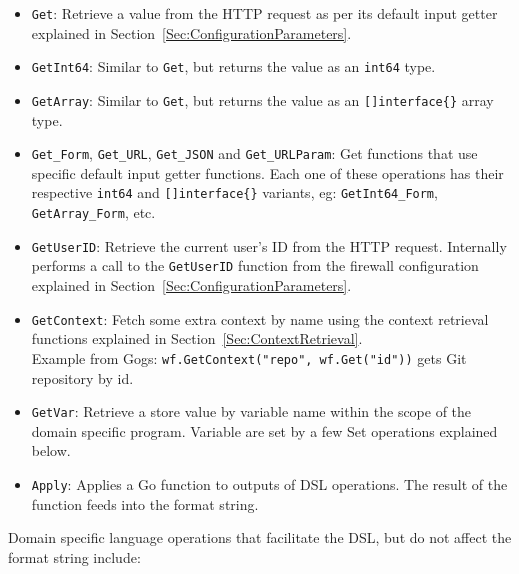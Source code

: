 \begin{itemize}[nosep]
\item \lstinline{Get}: Retrieve a value from the HTTP request as per its default input getter explained in Section~\ref{Sec:ConfigurationParameters}.

\item \lstinline{GetInt64}: Similar to \lstinline{Get}, but returns the value as an \lstinline{int64} type.

\item \lstinline{GetArray}: Similar to \lstinline{Get}, but returns the value as an \lstinline|[]interface{}| array type.

\item \lstinline{Get_Form}, \lstinline{Get_URL}, \lstinline{Get_JSON} and \lstinline{Get_URLParam}: Get functions that use specific default input getter functions. Each one of these operations has their respective \lstinline{int64} and \lstinline|[]interface{}| variants, eg: \lstinline{GetInt64_Form}, \lstinline{GetArray_Form}, etc.

\item \lstinline{GetUserID}: Retrieve the current user's ID from the HTTP request. Internally performs a call to the \lstinline{GetUserID} function from the firewall configuration explained in Section~\ref{Sec:ConfigurationParameters}.

\item \lstinline{GetContext}: Fetch some extra context by name using the context retrieval functions explained in Section~\ref{Sec:ContextRetrieval}. \\Example from Gogs: \lstinline{wf.GetContext("repo", wf.Get("id"))} gets Git repository by id.

\item \lstinline{GetVar}: Retrieve a store value by variable name within the scope of the domain specific program. Variable are set by a few Set operations explained below.

\item \lstinline{Apply}: Applies a Go function to outputs of DSL operations. The result of the function feeds into the format string.

\end{itemize}

\noindent Domain specific language operations that facilitate the DSL, but do not affect the format string include:

